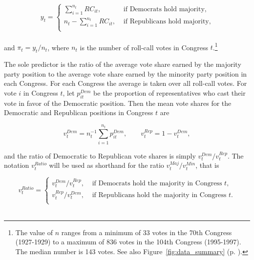 \begin{equation*}
y_t =
\begin{cases} \sum_{i=1}^{n_t} RC_{it}, & \text{ if Democrats hold majority}, \\[10pt]
n_t - \sum_{i=1}^{n_t} RC_{it}, & \text{ if Republicans hold majority,} \\
\end{cases}
\end{equation*}
~\\[-12pt]
 
\noindent and $\pi_t = y_t / n_t$, where $n_t$ is the number of roll-call votes in 
Congress $t$.\footnote{The value of $n$ ranges from a minimum of 33 votes in the 
70th Congress (1927-1929) to a maximum of 836 votes in the 104th Congress (1995-1997). 
The median number is 143 votes. See also Figure~\ref{fig:data_summary} 
(p. \pageref{fig:data_summary}).} 


The sole predictor is the ratio of the average vote share earned by the majority party position 
to the average vote share earned by the minority party position in each Congress. For each 
Congress the average is taken over all roll-call votes. For vote $i$ in Congress $t$, let 
$p_{it}^{Dem}$ be the proportion of representatives who cast their vote in favor of the Democratic 
position.  Then the mean vote shares for the Democratic and Republican positions in Congress 
$t$ are

\begin{equation*}
v_t^{Dem} = n_t^{-1} \sum_{i=1}^{n_t} p_{it}^{Dem}, \qquad v_t^{Rep} = 1 - v_t^{Dem},
\end{equation*}

\noindent and the ratio of Democratic to Republican vote shares is simply $v_t^{Dem} / v_t^{Rep}$. 
The notation $v_t^{Ratio}$ will be used as shorthand for the ratio $v_t^{Maj} / v_t^{Min}$, that is 

\begin{equation*}
v_t^{Ratio} = 
\begin{cases} 
v_t^{Dem} / v_t^{Rep}, & \text{ if Democrats hold the majority in Congress $t$,} \\[10pt]
v_t^{Rep} / v_t^{Dem}, & \text{ if Republicans hold the majority in Congress $t$.} \\
\end{cases}
\end{equation*}
~\\[-12pt]


